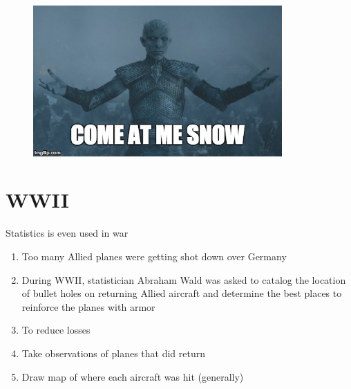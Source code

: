 \documentclass[aspectratio=1610,pdftex,dvipsnames,compress,xcolor={dvipsnames}]{beamer}
\begin{document}
\begin{frame}{}
    \begin{figure}
        \centering
        \includegraphics[width=0.85\textwidth]{walker.jpg}
    \end{figure}
\end{frame}


\section{WWII}


\addtocounter{framenumber}{-1}
\begin{frame}{Statistics is even used in war}
    \begin{enumerate}[series=outerlist,topsep=0pt,itemsep=21pt,leftmargin=*,label=(\arabic*)]
        \item[]Too many Allied planes were getting shot down over Germany
        \item[]During WWII, statistician Abraham Wald was asked to catalog the location of bullet holes on returning Allied aircraft and determine the best places to reinforce the planes with armor
        \item[]To reduce losses
        \item[]Take observations of planes that did return
        \item[]Draw map of where each aircraft was hit (generally)
    \end{enumerate}
\end{frame}
\end{document}
